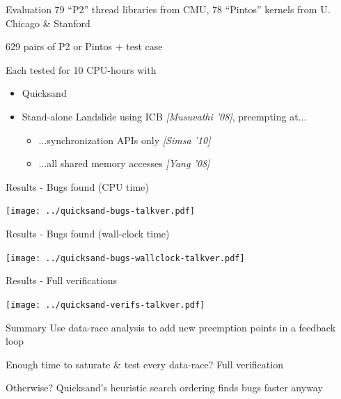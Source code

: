 \documentclass[xcolor=dvipsnames]{beamer}
\begin{document}
\begin{frame}{Evaluation}
	79 ``P2'' thread libraries from CMU, 78 ``Pintos'' kernels from U. Chicago \& Stanford
	\linegap

	629 pairs of P2 or Pintos + test case
	\linegap

	Each tested for 10 CPU-hours with
	\begin{itemize}
		\item Quicksand %
		\item Stand-alone Landslide using ICB {\em [Musuvathi '08]}, preempting at...
			\begin{itemize}
				\item ...synchronization APIs only {\em [Simsa '10]}
				\item ...all shared memory accesses
					{\em [Yang '08]} %
			\end{itemize}
	\end{itemize}
\end{frame}

\begin{frame}{Results - Bugs found (CPU time)}
	\begin{center}
		\texttt{[image: ../quicksand-bugs-talkver.pdf]}
	\end{center}
\end{frame}
\begin{frame}{Results - Bugs found (wall-clock time)}
	\begin{center}
		\texttt{[image: ../quicksand-bugs-wallclock-talkver.pdf]}
	\end{center}
\end{frame}
\begin{frame}{Results - Full verifications}
	\begin{center}
		\texttt{[image: ../quicksand-verifs-talkver.pdf]}
	\end{center}
\end{frame}

\begin{frame}{Summary}
	Use data-race analysis to add new preemption points in a feedback loop
	\linegap

	Enough time to saturate \& test every data-race? Full verification
	\linegap

	Otherwise? Quicksand's heuristic search ordering finds bugs faster anyway

\end{frame}
\end{document}
